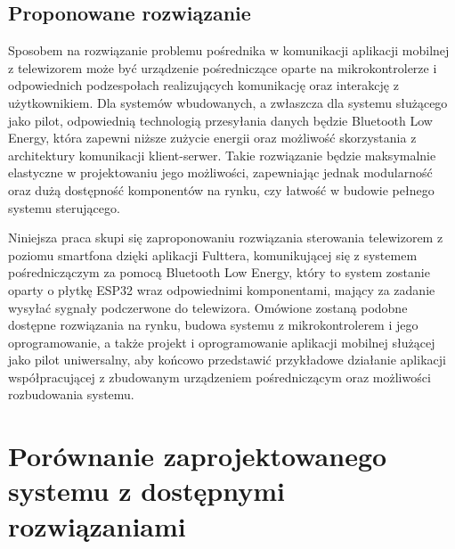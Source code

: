 \documentclass[12pt,twoside]{article}
\begin{document}
\subsection{Proponowane rozwiązanie}
{Sposobem na rozwiązanie problemu pośrednika w komunikacji aplikacji mobilnej z telewizorem
może być urządzenie pośredniczące oparte na mikrokontrolerze i odpowiednich podzespołach 
realizujących komunikację oraz interakcję z użytkownikiem. Dla systemów wbudowanych, a zwłaszcza
dla systemu służącego jako pilot, odpowiednią technologią przesyłania danych będzie Bluetooth Low Energy,
która zapewni niższe zużycie energii oraz możliwość skorzystania z architektury komunikacji klient-serwer.
 Takie rozwiązanie będzie maksymalnie elastyczne w projektowaniu jego możliwości, zapewniając jednak modularność
oraz dużą dostępność komponentów na rynku, czy łatwość w budowie pełnego systemu sterującego.

Niniejsza praca skupi się zaproponowaniu rozwiązania sterowania telewizorem z poziomu 
smartfona dzięki aplikacji Fulttera, komunikującej się z systemem pośredniczączym za pomocą 
Bluetooth Low Energy, który to system zostanie oparty o płytkę ESP32 wraz odpowiednimi komponentami,
mający za zadanie wysyłać sygnały podczerwone do telewizora. 
Omówione zostaną podobne dostępne rozwiązania na rynku, budowa systemu z
 mikrokontrolerem i jego oprogramowanie, a także projekt i oprogramowanie aplikacji
mobilnej służącej jako pilot uniwersalny, aby końcowo przedstawić przykładowe działanie 
aplikacji współpracującej z zbudowanym urządzeniem pośredniczącym oraz możliwości rozbudowania systemu.}

\clearpage
\section{Porównanie zaprojektowanego systemu z dostępnymi rozwiązaniami}
\end{document}

